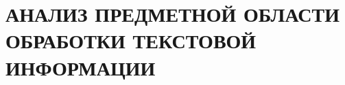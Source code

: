 \chapter{АНАЛИЗ ПРЕДМЕТНОЙ ОБЛАСТИ ОБРАБОТКИ ТЕКСТОВОЙ ИНФОРМАЦИИ}
\label{chap:analysis}
\aftertitle
